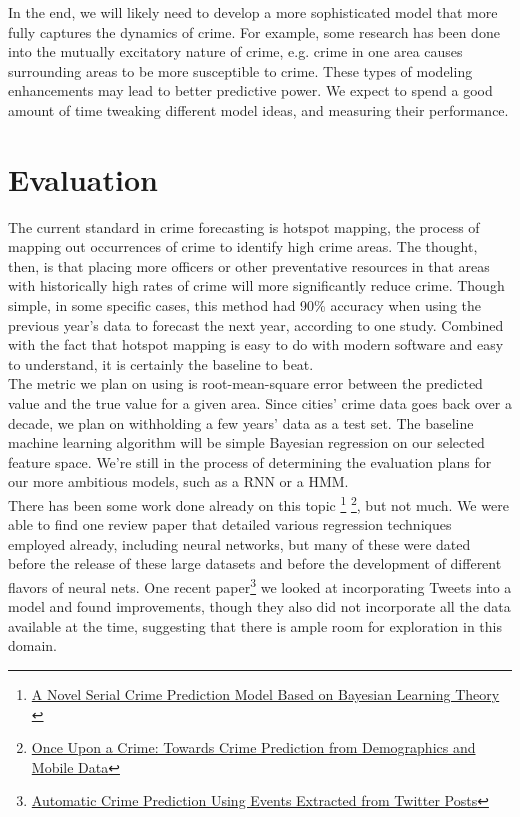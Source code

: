 \documentclass[10pt]{article}
\begin{document}
  In the end, we will likely need to develop a more sophisticated model that more fully captures the dynamics of crime. For example, some research has been done into the mutually excitatory nature of crime, e.g. crime in one area causes surrounding areas to be more susceptible to crime. These types of modeling enhancements may lead to better predictive power. We expect to spend a good amount of time tweaking different model ideas, and measuring their performance.

\section{Evaluation}
  The current standard in crime forecasting is hotspot mapping, the process of mapping out occurrences of crime to identify high crime areas. The thought, then, is that placing more officers or other preventative resources in that areas with historically high rates of crime will more significantly reduce crime. Though simple, in some specific cases, this method had 90\% accuracy when using the previous year's data to forecast the next year, according to one study. Combined with the fact that hotspot mapping is easy to do with modern software and easy to understand, it is certainly the baseline to beat. \\

  The metric we plan on using is root-mean-square error between the predicted value and the true value for a given area. Since cities' crime data goes back over a decade, we plan on withholding a few years' data as a test set. The baseline machine learning algorithm will be simple Bayesian regression on our selected feature space. We're still in the process of determining the evaluation plans for our more ambitious models, such as a RNN or a HMM.\\

  There has been some work done already on this topic \footnote{\href{http://ieeexplore.ieee.org.ezp-prod1.hul.harvard.edu/stamp/stamp.jsp?tp=&arnumber=5580971}{A Novel Serial Crime Prediction Model Based on Bayesian Learning Theory }} \footnote{\href{http://delivery.acm.org.ezp-prod1.hul.harvard.edu/10.1145/2670000/2663254/p427-bogomolov.pdf?ip=128.103.149.52&id=2663254&acc=ACTIVE\%20SERVICE&key=C82FBC3DCC335AD2\%2E4D4702B0C3E38B35\%2E4D4702B0C3E38B35\%2E4D4702B0C3E38B35&CFID=553305163&CFTOKEN=20331583&__acm__=1444871399_feb25f6bb65f577ea58bb1f29f2f176a}{Once Upon a Crime: Towards Crime Prediction from
Demographics and Mobile Data}}, but not much. We were able to find one review paper that detailed various regression techniques employed already, including neural networks, but many of these were dated before the release of these large datasets and before the development of different flavors of neural nets. One recent paper\footnote{\href{http://link.springer.com/chapter/10.1007/978-3-642-29047-3_28}{Automatic Crime Prediction Using Events Extracted from Twitter Posts}} we looked at incorporating Tweets into a model and found improvements, though they also did not incorporate all the data available at the time, suggesting that there is ample room for exploration in this domain.
\end{document}
